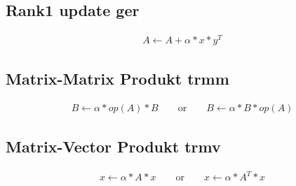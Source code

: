 \subsection{Rank1 update ger}
\begin{align}
	A \leftarrow A + \alpha * x * y^T
\end{align}

\subsection{Matrix-Matrix Produkt trmm}
\begin{align}
B \leftarrow  \alpha * op(A) * B \qquad \text{or} \qquad B \leftarrow  \alpha *  B * op(A)
\end{align}
\subsection{Matrix-Vector Produkt trmv}
\begin{align}
x \leftarrow \alpha * A*x \qquad \text{or} \qquad x \leftarrow \alpha * A^T*x
\end{align}

